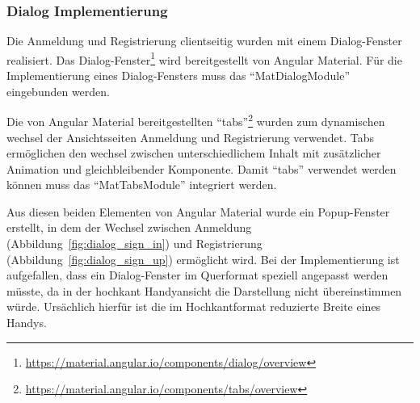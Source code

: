 \subsubsection{Dialog Implementierung}
\label{sec:client-dialog-authentication}
Die Anmeldung und Registrierung clientseitig wurden mit einem Dialog-Fenster realisiert. Das Dialog-Fenster\footnote{\url{https://material.angular.io/components/dialog/overview}} wird bereitgestellt von Angular Material. Für die Implementierung eines Dialog-Fensters muss das \enquote{MatDialogModule} eingebunden werden.

Die von Angular Material bereitgestellten \enquote{tabs}\footnote{\url{https://material.angular.io/components/tabs/overview}} wurden zum dynamischen wechsel der Ansichtsseiten Anmeldung und Registrierung verwendet. Tabs ermöglichen den wechsel zwischen unterschiedlichem Inhalt mit zusätzlicher Animation und gleichbleibender Komponente. Damit \enquote{tabs} verwendet werden können muss das \enquote{MatTabsModule} integriert werden.

Aus diesen beiden Elementen von Angular Material wurde ein Popup-Fenster erstellt, in dem der Wechsel zwischen Anmeldung (Abbildung~\ref{fig:dialog_sign_in}) und Registrierung (Abbildung~\ref{fig:dialog_sign_up}) ermöglicht wird. Bei der Implementierung ist aufgefallen, dass ein Dialog-Fenster im Querformat speziell angepasst werden müsste, da in der hochkant Handyansicht die Darstellung nicht übereinstimmen würde. Ursächlich hierfür ist die im Hochkantformat reduzierte Breite eines Handys.

